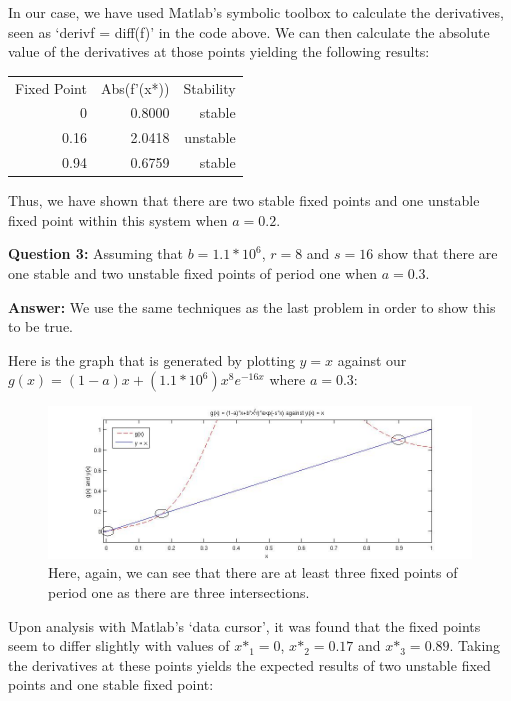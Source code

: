 \documentclass[12pt]{article}
\begin{document}
In our case, we have used Matlab's symbolic toolbox to calculate the derivatives, seen as `derivf = diff(f)' in the code above. We can then calculate the absolute value of the derivatives at those points yielding the following results:

\pagebreak

\begin{table}[h]
\centering
\begin{tabular}{rrr}
Fixed Point & Abs(f'(x*)) & Stability \\
0           & 0.8000      & stable    \\
0.16        & 2.0418      & unstable  \\
0.94        & 0.6759      & stable   
\end{tabular}
\end{table}

Thus, we have shown that there are two stable fixed points and one unstable fixed point within this system when $a = 0.2$.

\textbf{Question 3:} Assuming that $b=1.1*10^{6}$, $r=8$ and $s=16$ show that there are one stable and two unstable fixed points of period one when $a=0.3$.

\textbf{Answer:} We use the same techniques as the last problem in order to show this to be true.

Here is the graph that is generated by plotting $y=x$ against our $g(x) = (1-a)x+(1.1*10^{6})x^{8}e^{-16x}$ where $a = 0.3$: 

\begin{figure}[H]
    \begin{center}
    \includegraphics[width=\linewidth]{P1_Q3}
    \end{center}
    \caption{Here, again, we can see that there are at least three fixed points of period one as there are three intersections.}
    \label{figure:2.1}
\end{figure}

Upon analysis with Matlab's `data cursor', it was found that the fixed points seem to differ slightly with values of $x\text{*}_{1} = 0$, $x\text{*}_{2} = 0.17$ and $x\text{*}_{3} = 0.89$. Taking the derivatives at these points yields the expected results of two unstable fixed points and one stable fixed point: 
\end{document}
